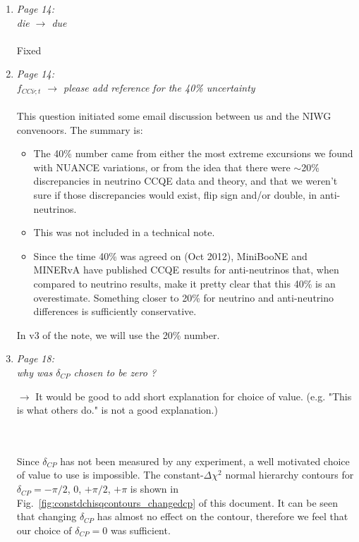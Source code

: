 \begin{enumerate}
  A sentence has been added to Sec.\ 2.3 to motivate the 7+6 $\rightarrow$ 6 parameter change.

  \vspace{5 mm}
\item
  {\em
    Page 14:\\ die $\rightarrow$ due
  }\\
  \\
  Fixed
  
  \vspace{5 mm}
\item
  {\em
    Page 14:\\
    $f_{CC\bar{\nu}; t}$  $\rightarrow$ please add reference for the 40\% uncertainty
  }\\
  \\
  This question initiated some email discussion between us and the NIWG convenoors. The summary is:

  \begin{itemize}
  \item The 40\% number came from either
    the most extreme excursions we found with NUANCE variations,
    or from the idea that there were $\sim$20\% discrepancies in neutrino
    CCQE data and theory, and that we weren't sure if those discrepancies would exist, flip sign and/or double, in anti-neutrinos.
  \item This was not included in a technical note.
  \item Since the time 40\% was agreed on (Oct 2012), MiniBooNE and MINERvA have published CCQE results for anti-neutrinos that,
    when compared to neutrino results, make it pretty clear that this 40\% is an overestimate.
    Something closer to 20\% for neutrino and anti-neutrino differences is sufficiently conservative.
  \end{itemize}

  In v3 of the note, we will use the 20\% number.
  
  \vspace{5 mm}
\item
  {\em
    Page 18:\\
    why was $\delta_{CP}$ chosen to be zero ?
    
    $\rightarrow$ It would be good to add short explanation for choice of value.
    (e.g. "This is what others do." is not a good explanation.)
  }\\
  \\
  Since $\delta_{CP}$ has not been measured by any experiment, a well motivated choice of value to use
  is impossible.
  The constant-$\Delta\chi^2$ normal hierarchy contours for
  $\delta_{CP} = -\pi/2$, 0, $+\pi/2$, $+\pi$
  is shown
  in Fig.\ \ref{fig:constdchisqcontours_changedcp} of this document.
  It can be seen that changing $\delta_{CP}$ has almost no effect on the contour,
  therefore we feel that our choice of $\delta_{CP} = 0$ was sufficient.


\end{enumerate}
